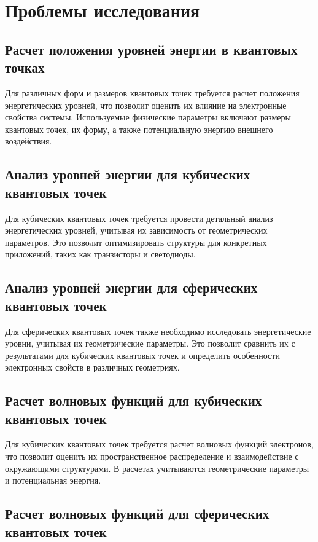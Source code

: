 \documentclass[a4paper,14pt]{extarticle}
\begin{document}
\section*{Проблемы исследования}

\subsection*{Расчет положения уровней энергии в квантовых точках}

Для различных форм и размеров квантовых точек требуется расчет положения энергетических уровней, что позволит оценить их влияние на электронные свойства системы. Используемые физические параметры включают размеры квантовых точек, их форму, а также потенциальную энергию внешнего воздействия.

\subsection*{Анализ уровней энергии для кубических квантовых точек}

Для кубических квантовых точек требуется провести детальный анализ энергетических уровней, учитывая их зависимость от геометрических параметров. Это позволит оптимизировать структуры для конкретных приложений, таких как транзисторы и светодиоды.

\subsection*{Анализ уровней энергии для сферических квантовых точек} \cite{mathe}

Для сферических квантовых точек также необходимо исследовать энергетические уровни, учитывая их геометрические параметры. Это позволит сравнить их с результатами для кубических квантовых точек и определить особенности электронных свойств в различных геометриях.

\subsection*{Расчет волновых функций для кубических квантовых точек}

Для кубических квантовых точек требуется расчет волновых функций электронов, что позволит оценить их пространственное распределение и взаимодействие с окружающими структурами. В расчетах учитываются геометрические параметры и потенциальная энергия.

\subsection*{Расчет волновых функций для сферических квантовых точек}
\end{document}
